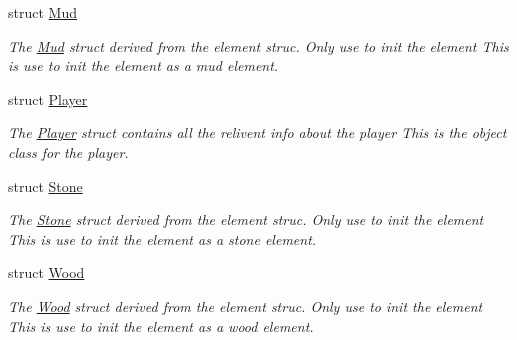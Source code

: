 \begin{DoxyCompactItemize}
struct \hyperlink{structoctet_1_1_mud}{Mud}
\begin{DoxyCompactList}\small\item\em The \hyperlink{structoctet_1_1_mud}{Mud} struct derived from the element struc. Only use to init the element This is use to init the element as a mud element. \end{DoxyCompactList}\item 
struct \hyperlink{structoctet_1_1_player}{Player}
\begin{DoxyCompactList}\small\item\em The \hyperlink{structoctet_1_1_player}{Player} struct contains all the relivent info about the player This is the object class for the player. \end{DoxyCompactList}\item 
struct \hyperlink{structoctet_1_1_stone}{Stone}
\begin{DoxyCompactList}\small\item\em The \hyperlink{structoctet_1_1_stone}{Stone} struct derived from the element struc. Only use to init the element This is use to init the element as a stone element. \end{DoxyCompactList}\item 
struct \hyperlink{structoctet_1_1_wood}{Wood}
\begin{DoxyCompactList}\small\item\em The \hyperlink{structoctet_1_1_wood}{Wood} struct derived from the element struc. Only use to init the element This is use to init the element as a wood element. \end{DoxyCompactList}\end{DoxyCompactItemize}
